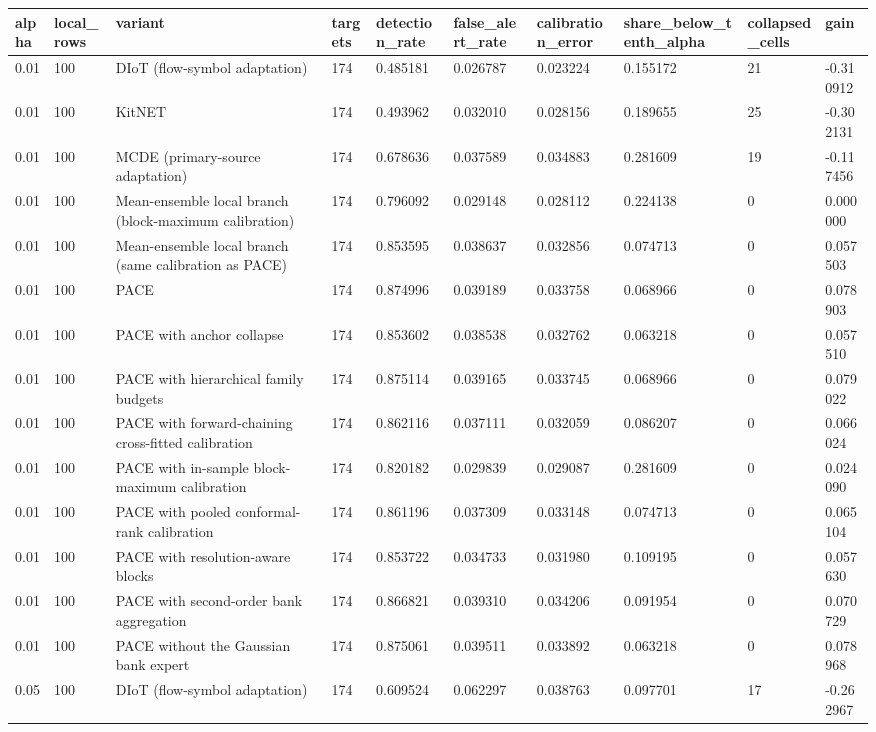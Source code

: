 \begin{tabular}{llllllllll}
\toprule
alpha & local\_rows & variant & targets & detection\_rate & false\_alert\_rate & calibration\_error & share\_below\_tenth\_alpha & collapsed\_cells & gain \\
\midrule
0.01 & 100 & DIoT (flow-symbol adaptation) & 174 & 0.485181 & 0.026787 & 0.023224 & 0.155172 & 21 & -0.310912 \\
0.01 & 100 & KitNET & 174 & 0.493962 & 0.032010 & 0.028156 & 0.189655 & 25 & -0.302131 \\
0.01 & 100 & MCDE (primary-source adaptation) & 174 & 0.678636 & 0.037589 & 0.034883 & 0.281609 & 19 & -0.117456 \\
0.01 & 100 & Mean-ensemble local branch (block-maximum calibration) & 174 & 0.796092 & 0.029148 & 0.028112 & 0.224138 & 0 & 0.000000 \\
0.01 & 100 & Mean-ensemble local branch (same calibration as PACE) & 174 & 0.853595 & 0.038637 & 0.032856 & 0.074713 & 0 & 0.057503 \\
0.01 & 100 & PACE & 174 & 0.874996 & 0.039189 & 0.033758 & 0.068966 & 0 & 0.078903 \\
0.01 & 100 & PACE with anchor collapse & 174 & 0.853602 & 0.038538 & 0.032762 & 0.063218 & 0 & 0.057510 \\
0.01 & 100 & PACE with hierarchical family budgets & 174 & 0.875114 & 0.039165 & 0.033745 & 0.068966 & 0 & 0.079022 \\
0.01 & 100 & PACE with forward-chaining cross-fitted calibration & 174 & 0.862116 & 0.037111 & 0.032059 & 0.086207 & 0 & 0.066024 \\
0.01 & 100 & PACE with in-sample block-maximum calibration & 174 & 0.820182 & 0.029839 & 0.029087 & 0.281609 & 0 & 0.024090 \\
0.01 & 100 & PACE with pooled conformal-rank calibration & 174 & 0.861196 & 0.037309 & 0.033148 & 0.074713 & 0 & 0.065104 \\
0.01 & 100 & PACE with resolution-aware blocks & 174 & 0.853722 & 0.034733 & 0.031980 & 0.109195 & 0 & 0.057630 \\
0.01 & 100 & PACE with second-order bank aggregation & 174 & 0.866821 & 0.039310 & 0.034206 & 0.091954 & 0 & 0.070729 \\
0.01 & 100 & PACE without the Gaussian bank expert & 174 & 0.875061 & 0.039511 & 0.033892 & 0.063218 & 0 & 0.078968 \\
0.05 & 100 & DIoT (flow-symbol adaptation) & 174 & 0.609524 & 0.062297 & 0.038763 & 0.097701 & 17 & -0.262967 \\

\end{tabular}
